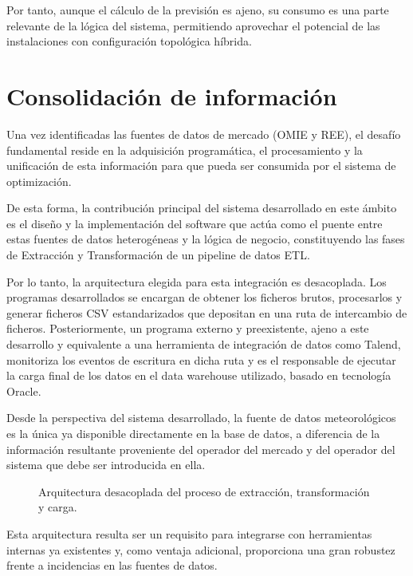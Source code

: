 Por tanto, aunque el cálculo de la previsión es ajeno, su consumo es una parte relevante de la lógica del sistema, permitiendo aprovechar el potencial de las instalaciones con configuración topológica híbrida.

\section{Consolidación de información}
\label{makereference4.4}

Una vez identificadas las fuentes de datos de mercado (OMIE y REE), el desafío fundamental reside en la adquisición programática, el procesamiento y la unificación de esta información para que pueda ser consumida por el sistema de optimización.

De esta forma, la contribución principal del sistema desarrollado en este ámbito es el diseño y la implementación del software que actúa como el puente entre estas fuentes de datos heterogéneas y la lógica de negocio, constituyendo las fases de Extracción y Transformación de un pipeline de datos ETL.

Por lo tanto, la arquitectura elegida para esta integración es desacoplada. Los programas desarrollados se encargan de obtener los ficheros brutos, procesarlos y generar ficheros CSV estandarizados que depositan en una ruta de intercambio de ficheros. Posteriormente, un programa externo y preexistente, ajeno a este desarrollo y equivalente a una herramienta de integración de datos como Talend, monitoriza los eventos de escritura en dicha ruta y es el responsable de ejecutar la carga final de los datos en el data warehouse utilizado, basado en tecnología Oracle.

Desde la perspectiva del sistema desarrollado, la fuente de datos meteorológicos es la única ya disponible directamente en la base de datos, a diferencia de la información resultante proveniente del operador del mercado y del operador del sistema que debe ser introducida en ella.

\begin{figure}
  \centering
  \caption{Arquitectura desacoplada del proceso de extracción, transformación y carga.}
  \label{fig:arquitectura-mercado}
\end{figure}

Esta arquitectura resulta ser un requisito para integrarse con herramientas internas ya existentes y, como ventaja adicional, proporciona una gran robustez frente a incidencias en las fuentes de datos.

